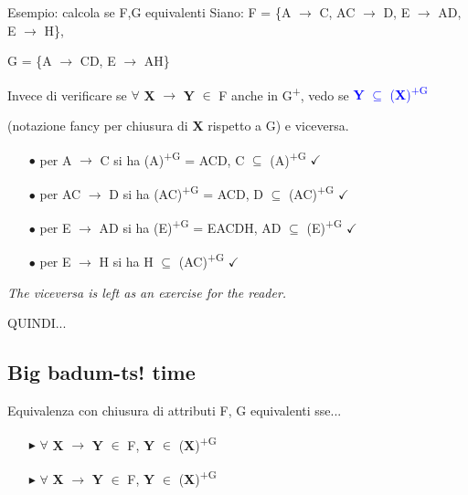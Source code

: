 \documentclass{beamer}
\begin{document}
\begin{frame}{Esempio: calcola se F,G equivalenti}
Siano: F = \{A $\rightarrow$ C, AC $\rightarrow$ D, E $\rightarrow$ AD, E $\rightarrow$ H\},\par
\hspace{1cm} G = \{A $\rightarrow$ CD, E $\rightarrow$ AH\}

\begin{block}{}
    Invece di verificare se $\forall$ \textbf{X} $\rightarrow$ \textbf{Y} $\in$ F anche in G\textsuperscript{+}, vedo se \textcolor{blue}{\textbf{Y} $\subseteq$ (\textbf{X})\textsuperscript{+G}}\par (notazione fancy per chiusura di \textbf{X} rispetto a G) e viceversa.
\end{block}

\begin{itemize}
    \item[$\bullet$] per A $\rightarrow$ C si ha (A)\textsuperscript{+G} = ACD, C $\subseteq$ (A)\textsuperscript{+G} $\checkmark$
    \item[$\bullet$] per AC $\rightarrow$ D si ha (AC)\textsuperscript{+G} = ACD, D $\subseteq$ (AC)\textsuperscript{+G} $\checkmark$
    \item[$\bullet$] per E $\rightarrow$ AD si ha (E)\textsuperscript{+G} = EACDH, AD $\subseteq$ (E)\textsuperscript{+G} $\checkmark$
    \item[$\bullet$] per E $\rightarrow$ H si ha H $\subseteq$ (AC)\textsuperscript{+G} $\checkmark$
\end{itemize}
\textit{The viceversa is left as an exercise for the reader.}\par
\Huge\centering QUINDI...
\end{frame}

\subsection{Big badum-ts! time}
\begin{frame}{Equivalenza con chiusura di attributi}
    \huge
    F, G equivalenti sse...
    \begin{itemize}
        \centering
        \item[$\blacktriangleright$] $\forall$ \textbf{X} $\rightarrow$ \textbf{Y} $\in$ F, \textbf{Y} $\in$ (\textbf{X})\textsuperscript{+G}
        \item[$\blacktriangleright$] $\forall$ \textbf{X} $\rightarrow$ \textbf{Y} $\in$ F, \textbf{Y} $\in$ (\textbf{X})\textsuperscript{+G}
    \end{itemize}
\end{frame}
\end{document}
